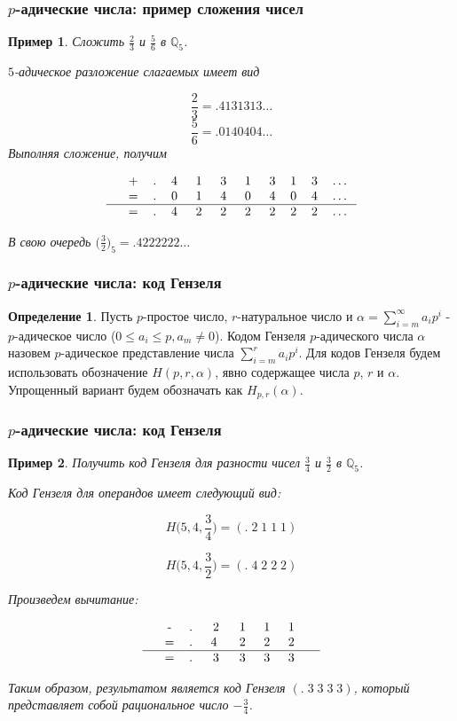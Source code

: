 \documentclass[10pt,professionalfont,utf8,presentation,compress]{beamer}
\theoremstyle{definition}
\newtheorem{defn}{Определение}
\theoremstyle{plain}
\newtheorem{exmp}{Пример}
\begin{document}
\begin{frame}
\frametitle{$p$-адические числа: пример сложения чисел}

\begin{exmp}
Сложить $\frac{2}{3}$ и $\frac{5}{6}$ в $\mathbb{Q}_5$.

\noindent $5$-адическое разложение слагаемых имеет вид

$$
\frac{2}{3}=.4131313\dots
$$
$$
\frac{5}{6}=.0140404\dots
$$
Выполняя сложение, получим

$$
\begin{tabular}{cccccccccccc}
& + & . & 4\; & 1\; & 3\; & 1\; & 3 & 1 & 3 & \dots \\
& = & . & 0\; & 1\; & 4\; & 0\; & 4 & 0 & 4 & \dots \\
\hline
& = & . & 4\; & 2\; & 2\; & 2\; & 2 & 2 & 2 & \dots
\end{tabular}
$$

\noindent В свою очередь $\bigg(\frac{3}{2}\bigg)_5=.4222222\dots$
\end{exmp}
\end{frame}


\begin{frame}
\frametitle{$p$-адические числа: код Гензеля}
\begin{defn}
Пусть $p$-простое число, $r$-натуральное число и $\alpha=\sum\limits^{\infty}_{i=m} a_ip^i$ - $p$-адическое число ($0 \le a_i \le p, a_m \neq 0$). Кодом Гензеля $p$-адического числа $\alpha$ назовем $p$-адическое представление числа $\sum\limits_{i=m}^{r}a_ip^i$. Для кодов Гензеля будем использовать обозначение $H(p,r,\alpha)$, явно содержащее числа $p$, $r$ и $\alpha$. Упрощенный вариант будем обозначать как $H_{p,r}(\alpha)$.
\end{defn}
\end{frame}


\begin{frame}
\frametitle{$p$-адические числа: код Гензеля}
\begin{exmp}
Получить код Гензеля для разности чисел $\frac{3}{4}$ и $\frac{3}{2}$ в $\mathbb{Q}_5$.

\noindent Код Гензеля для операндов имеет следующий вид:

$$H\bigg(5,4, \frac{3}{4}\bigg)=(.\; 2\; 1\; 1\; 1)$$

$$H\bigg(5,4, \frac{3}{2}\bigg)=(.\; 4\; 2\; 2\; 2)$$


\noindent Произведем вычитание:

$$
\begin{tabular}{ccccccccccc}
& - & .\; & 2\; & 1\; & 1\; & 1\;  &  \\
& = & .\; & 4 \; & 2\; & 2\; & 2\; &  \\
\hline
& = & .\; & 3\; & 3\; & 3\; & 3\; &
\end{tabular}
$$

\noindent Таким образом, результатом является код Гензеля $(.\; 3\; 3\; 3\; 3)$, который представляет собой рациональное число $-\frac{3}{4}$.
\end{exmp}
\end{frame}
\end{document}
